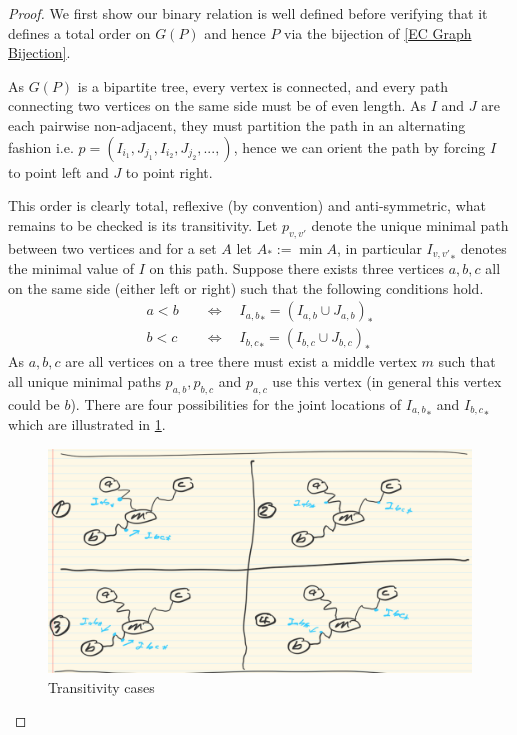 \documentclass[11pt]{amsart}
\theoremstyle{definition}
\theoremstyle{remark}
\numberwithin{equation}{section}
\newcommand{\0}{\color{blue}{\mathsf{0}}}
\begin{document}
\begin{proof}
We first show our binary relation is well defined before verifying that it defines a total order on $G(P)$ and hence $P$ via the bijection of \cref{EC Graph Bijection}.

As $G(P)$ is a bipartite tree, every vertex is connected, and every path connecting two vertices on the same side must be of even length. 
As $I$ and $J$ are each pairwise non-adjacent, they must partition the path in an alternating fashion i.e. $p=(I_{i_1},J_{j_1},I_{i_2},J_{j_2},..., )$, hence we can orient the path by forcing $I$ to point left and $J$ to point right.

This order is clearly total, reflexive (by convention) and anti-symmetric, what remains to be checked is its transitivity. 
Let $p_{v,v'}$ denote the unique minimal path between two vertices and for a set $A$ let $A_*:= \min A$, in particular ${I_{v,v'}}_*$ denotes the minimal value of $I$ on this path. 
Suppose there exists three vertices $a,b,c$ all on the same side (either left or right) such that the following conditions hold.
\begin{align*}
    a<b \quad &\iff \quad {I_{a,b}}_* = ({I_{a,b}} \cup J_{a,b})_*\\
    b<c \quad &\iff \quad{I_{b,c}}_* = ({I_{b,c}} \cup J_{b,c})_*
\end{align*}
As $a,b,c$ are all vertices on a tree there must exist a middle vertex $m$ such that all unique minimal paths $p_{a,b},p_{b,c}$ and $p_{a,c}$ use this vertex (in general this vertex could be $b$). There are four possibilities for the joint locations of ${I_{a,b}}_*$ and ${I_{b,c}}_*$ which are illustrated in \cref{fig:transitivity-cases}.

\begin{figure}
\begin{center}
\includegraphics{Images/transitivity cases.png}   
\end{center}
\caption{Transitivity cases}
\label{fig:transitivity-cases}
\end{figure}


\end{proof}
\end{document}
